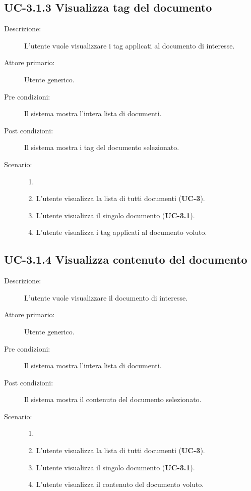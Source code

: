 \subsection{UC-3.1.3 Visualizza tag del documento}
\begin{description}
    \item[Descrizione:] L'utente vuole visualizzare i tag applicati al documento di interesse.
    \item[Attore primario:] Utente generico.
    \item[Pre condizioni:] Il sistema mostra l’intera lista di documenti.
    \item[Post condizioni:] Il sistema mostra i tag del documento selezionato.
    \item[Scenario:]
    \begin{enumerate}
        \item[]
        \item L’utente visualizza la lista di tutti documenti (\textbf{UC-3}).
        \item L'utente visualizza il singolo documento (\textbf{UC-3.1}).
        \item L'utente visualizza i tag applicati al documento voluto.
    \end{enumerate}
\end{description}

\subsection{UC-3.1.4 Visualizza contenuto del documento}
\begin{description}
    \item[Descrizione:] L'utente vuole visualizzare il documento di interesse.
    \item[Attore primario:] Utente generico.
    \item[Pre condizioni:] Il sistema mostra l’intera lista di documenti.
    \item[Post condizioni:] Il sistema mostra il contenuto del documento selezionato.
    \item[Scenario:]
    \begin{enumerate}
        \item[]
        \item L’utente visualizza la lista di tutti documenti (\textbf{UC-3}).
        \item L'utente visualizza il singolo documento (\textbf{UC-3.1}).
        \item L'utente visualizza il contenuto del documento voluto.
    \end{enumerate}
\end{description}

